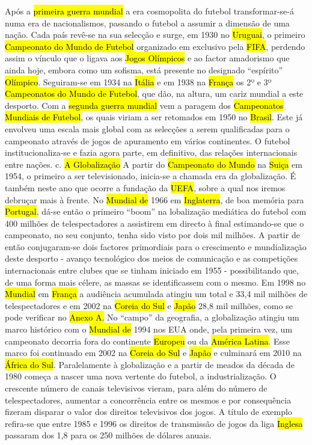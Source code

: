 \documentclass[a4paper,12pt]{article}
\begin{document}
 Após a \hl{primeira guerra mundial} a era cosmopolita do futebol transformar-se-á numa era de nacionalismos, passando o futebol a assumir a dimensão de uma nação.
 Cada país revê-se na sua selecção e surge, em 1930 no \hl{Uruguai}, o primeiro \hl{Campeonato do Mundo de Futebol} organizado em exclusivo pela \hl{FIFA}, perdendo assim o vínculo que o ligava aos \hl{Jogos Olímpicos} e ao factor amadorismo que ainda hoje, embora como um sofisma, está presente no designado “espírito” \hl{Olímpico}.
 Seguiram-se em 1934 na \hl{Itália} e em 1938 na \hl{França} os 2º e 3º \hl{Campeonatos do Mundo de Futebol}, que dão, na altura, um cariz mundial a este desporto.
 Com a \hl{segunda guerra mundial} vem a paragem dos \hl{Campeonatos Mundiais de Futebol}, os quais viriam a ser retomados em 1950 no \hl{Brasil}. Este já envolveu uma escala mais global com as selecções a serem qualificadas para o campeonato através de jogos de apuramento em vários continentes.
 O futebol institucionaliza-se e fazia agora parte, em definitivo, das relações internacionais entre nações.
 c. \hl{A Globalização}
 A partir do \hl{Campeonato do Mundo} na \hl{Suiça} em 1954, o primeiro a ser televisionado, inicia-se a chamada era da globalização. É também neste ano que ocorre a fundação da \hl{UEFA}, sobre a qual nos iremos debruçar mais à frente.
 No \hl{Mundial de} 1966 em \hl{Inglaterra}, de boa memória para \hl{Portugal}, dá-se então o primeiro “boom” na lobalização mediática do futebol com 400 milhões de telespectadores a assistirem em directo à final estimando-se que o campeonato, no seu conjunto, tenha sido visto por dois mil milhões. A partir de então conjugaram-se dois factores primordiais para o crescimento e mundialização deste desporto - avanço tecnológico dos meios de comunicação e as competições internacionais entre clubes que se tinham iniciado em
1955 - possibilitando que, de uma forma mais célere, as massas se identificassem com o mesmo.
 Em 1998 no \hl{Mundial} em \hl{França} a audiência acumulada atingiu um total e 33,4 mil milhões de telespectadores e em 2002 na \hl{Coreia do Sul} e \hl{Japão} 28,8 mil milhões, como se pode verificar no \hl{Anexo A.}
 No “campo” da geografia, a globalização atingiu um marco histórico com o \hl{Mundial de}
1994 nos EUA onde, pela primeira vez, um campeonato decorria fora do continente
 \hl{Europeu} ou da \hl{América Latina}. Esse marco foi continuado em 2002 na \hl{Coreia do Sul} e \hl{Japão} e culminará em 2010 na \hl{África do Sul}.
 Paralelamente à globalização e a partir de meados da década de 1980 começa a nascer uma nova vertente do futebol, a industrialização. O crescente número de canais televisivos vieram, para além do número de telespectadores, aumentar a concorrência entre os mesmos e por consequência fizeram disparar o valor dos direitos televisivos dos jogos. A título de exemplo refira-se que entre 1985 e 1996 os direitos de transmissão de jogos da liga \hl{Inglesa} passaram dos 1,8 para os 250 milhões de dólares anuais.
\end{document}
